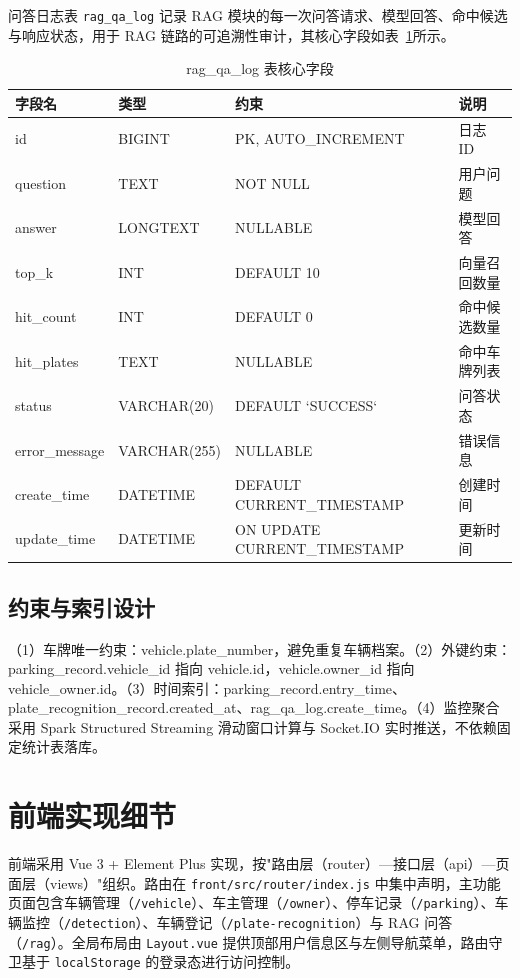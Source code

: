 \documentclass{wzuthesis} %
\begin{document}
问答日志表 \texttt{rag\_qa\_log} 记录 RAG 模块的每一次问答请求、模型回答、命中候选与响应状态，用于 RAG 链路的可追溯性审计，其核心字段如表~\ref{tab:ddl-rag-log}所示。

\begin{table}[H]
\centering
\footnotesize
\caption{rag\_qa\_log 表核心字段}
\label{tab:ddl-rag-log}
\begin{tabular}{|p{2.2cm}|p{2.2cm}|p{4.0cm}|p{4.5cm}|}
\hline
字段名 & 类型 & 约束 & 说明 \\
\hline
id & BIGINT & PK, AUTO\_INCREMENT & 日志 ID \\
\hline
question & TEXT & NOT NULL & 用户问题 \\
\hline
answer & LONGTEXT & NULLABLE & 模型回答 \\
\hline
top\_k & INT & DEFAULT 10 & 向量召回数量 \\
\hline
hit\_count & INT & DEFAULT 0 & 命中候选数量 \\
\hline
hit\_plates & TEXT & NULLABLE & 命中车牌列表 \\
\hline
status & VARCHAR(20) & DEFAULT `SUCCESS` & 问答状态 \\
\hline
error\_message & VARCHAR(255) & NULLABLE & 错误信息 \\
\hline
create\_time & DATETIME & DEFAULT CURRENT\_TIMESTAMP & 创建时间 \\
\hline
update\_time & DATETIME & ON UPDATE CURRENT\_TIMESTAMP & 更新时间 \\
\hline
\end{tabular}
\end{table}

\subsection{约束与索引设计}

（1）车牌唯一约束：vehicle.plate\_number，避免重复车辆档案。（2）外键约束：parking\_record.vehicle\_id 指向 vehicle.id，vehicle.owner\_id 指向 vehicle\_owner.id。（3）时间索引：parking\_record.entry\_time、plate\_recognition\_record.created\_at、rag\_qa\_log.create\_time。（4）监控聚合采用 Spark Structured Streaming 滑动窗口计算与 Socket.IO 实时推送，不依赖固定统计表落库。

\section{前端实现细节}

前端采用 Vue 3 + Element Plus 实现，按"路由层（router）—接口层（api）—页面层（views）"组织。路由在 \nolinkurl{front/src/router/index.js} 中集中声明，主功能页面包含车辆管理（\texttt{/vehicle}）、车主管理（\texttt{/owner}）、停车记录（\texttt{/parking}）、车辆监控（\texttt{/detection}）、车辆登记（\texttt{/plate-recognition}）与 RAG 问答（\texttt{/rag}）。全局布局由 \texttt{Layout.vue} 提供顶部用户信息区与左侧导航菜单，路由守卫基于 \texttt{localStorage} 的登录态进行访问控制。
\end{document}
